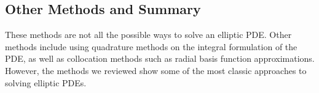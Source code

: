 %
%

\subsection{Other Methods and Summary}

These methods are not all the possible ways to solve an elliptic PDE. Other methods include using quadrature methods on the integral formulation of the PDE, as well as collocation methods such as radial basis function approximations. However, the methods we reviewed show some of the most classic approaches to solving elliptic PDEs.
